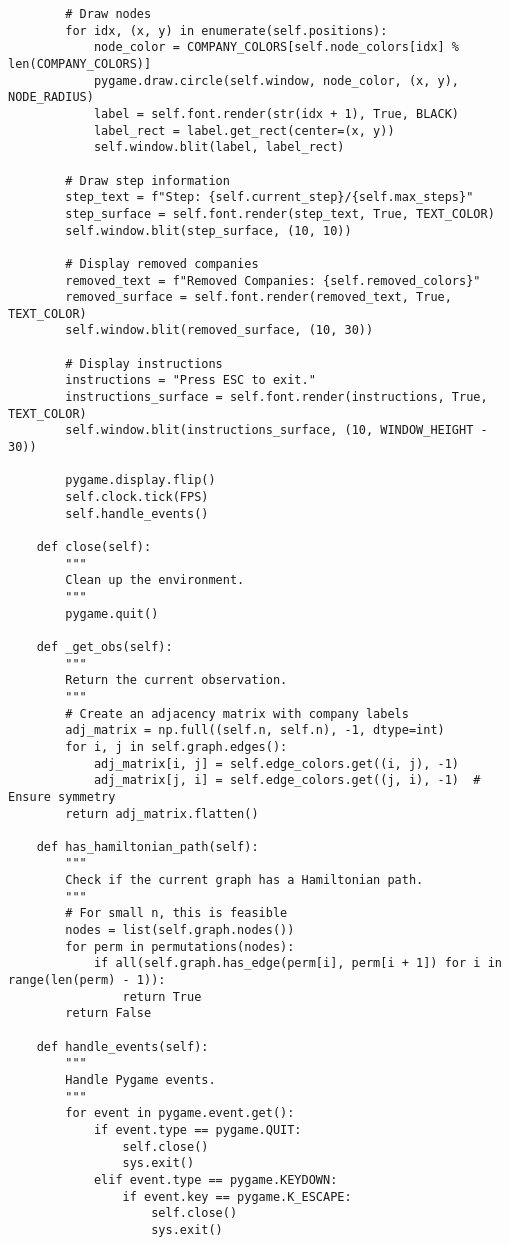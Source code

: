 \begin{lstlisting}
        # Draw nodes
        for idx, (x, y) in enumerate(self.positions):
            node_color = COMPANY_COLORS[self.node_colors[idx] % len(COMPANY_COLORS)]
            pygame.draw.circle(self.window, node_color, (x, y), NODE_RADIUS)
            label = self.font.render(str(idx + 1), True, BLACK)
            label_rect = label.get_rect(center=(x, y))
            self.window.blit(label, label_rect)

        # Draw step information
        step_text = f"Step: {self.current_step}/{self.max_steps}"
        step_surface = self.font.render(step_text, True, TEXT_COLOR)
        self.window.blit(step_surface, (10, 10))

        # Display removed companies
        removed_text = f"Removed Companies: {self.removed_colors}"
        removed_surface = self.font.render(removed_text, True, TEXT_COLOR)
        self.window.blit(removed_surface, (10, 30))

        # Display instructions
        instructions = "Press ESC to exit."
        instructions_surface = self.font.render(instructions, True, TEXT_COLOR)
        self.window.blit(instructions_surface, (10, WINDOW_HEIGHT - 30))

        pygame.display.flip()
        self.clock.tick(FPS)
        self.handle_events()

    def close(self):
        """
        Clean up the environment.
        """
        pygame.quit()

    def _get_obs(self):
        """
        Return the current observation.
        """
        # Create an adjacency matrix with company labels
        adj_matrix = np.full((self.n, self.n), -1, dtype=int)
        for i, j in self.graph.edges():
            adj_matrix[i, j] = self.edge_colors.get((i, j), -1)
            adj_matrix[j, i] = self.edge_colors.get((j, i), -1)  # Ensure symmetry
        return adj_matrix.flatten()

    def has_hamiltonian_path(self):
        """
        Check if the current graph has a Hamiltonian path.
        """
        # For small n, this is feasible
        nodes = list(self.graph.nodes())
        for perm in permutations(nodes):
            if all(self.graph.has_edge(perm[i], perm[i + 1]) for i in range(len(perm) - 1)):
                return True
        return False

    def handle_events(self):
        """
        Handle Pygame events.
        """
        for event in pygame.event.get():
            if event.type == pygame.QUIT:
                self.close()
                sys.exit()
            elif event.type == pygame.KEYDOWN:
                if event.key == pygame.K_ESCAPE:
                    self.close()
                    sys.exit()

\end{lstlisting}

